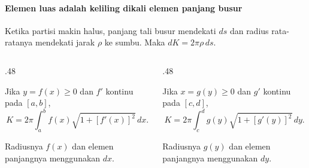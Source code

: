 \documentclass{../../kalkulus-ppt}
\begin{document}
\begin{frame}{\insertsection}
    \framesubtitle{Elemen luas adalah keliling dikali elemen panjang busur}
    Ketika partisi makin halus, panjang tali busur mendekati $ds$ dan
    radius rata-ratanya mendekati jarak $\rho$ ke sumbu. Maka $dK=2\pi\rho\,ds$.
    \begin{columns}[t,onlytextwidth]
        \begin{column}{.48\textwidth}
            \begin{teorema}
                Jika $y=f(x)\ge0$ dan $f'$ kontinu pada $[a,b]$,
                \[
                    K=2\pi\int_a^b f(x)\sqrt{1+[f'(x)]^2}\,dx.
                \]
            \end{teorema}
            Radiusnya $f(x)$ dan elemen panjangnya menggunakan $dx$.
        \end{column}
        \begin{column}{.48\textwidth}
            \begin{teorema}
                Jika $x=g(y)\ge0$ dan $g'$ kontinu pada $[c,d]$,
                \[
                    K=2\pi\int_c^d g(y)\sqrt{1+[g'(y)]^2}\,dy.
                \]
            \end{teorema}
            Radiusnya $g(y)$ dan elemen panjangnya menggunakan $dy$.
        \end{column}
    \end{columns}
\end{frame}
\end{document}
